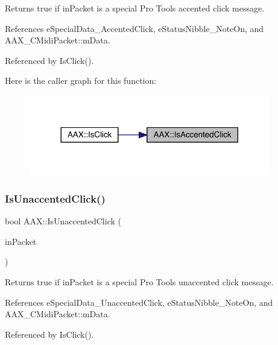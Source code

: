 Returns true if {\ttfamily in\+Packet} is a special Pro Tools accented click message. 



References e\+Special\+Data\+\_\+\+Accented\+Click, e\+Status\+Nibble\+\_\+\+Note\+On, and A\+A\+X\+\_\+\+C\+Midi\+Packet\+::m\+Data.



Referenced by Is\+Click().

Here is the caller graph for this function\+:
\nopagebreak
\begin{figure}[H]
\begin{center}
\leavevmode
\includegraphics[width=300pt]{a00852_afd05400c946e625772428cad4be7d552_icgraph}
\end{center}
\end{figure}
\mbox{\label{a00852_a4f915a56cb150638f036cb7ed33facd8}} 
\subsubsection{\texorpdfstring{IsUnaccentedClick()}{IsUnaccentedClick()}}
{\footnotesize\ttfamily bool A\+A\+X\+::\+Is\+Unaccented\+Click (\begin{DoxyParamCaption}\item[{const \mbox{\hyperlink{a01429}{A\+A\+X\+\_\+\+C\+Midi\+Packet}} $\ast$}]{in\+Packet }\end{DoxyParamCaption})\hspace{0.3cm}{\ttfamily [inline]}}



Returns true if {\ttfamily in\+Packet} is a special Pro Tools unaccented click message. 



References e\+Special\+Data\+\_\+\+Unaccented\+Click, e\+Status\+Nibble\+\_\+\+Note\+On, and A\+A\+X\+\_\+\+C\+Midi\+Packet\+::m\+Data.



Referenced by Is\+Click().

